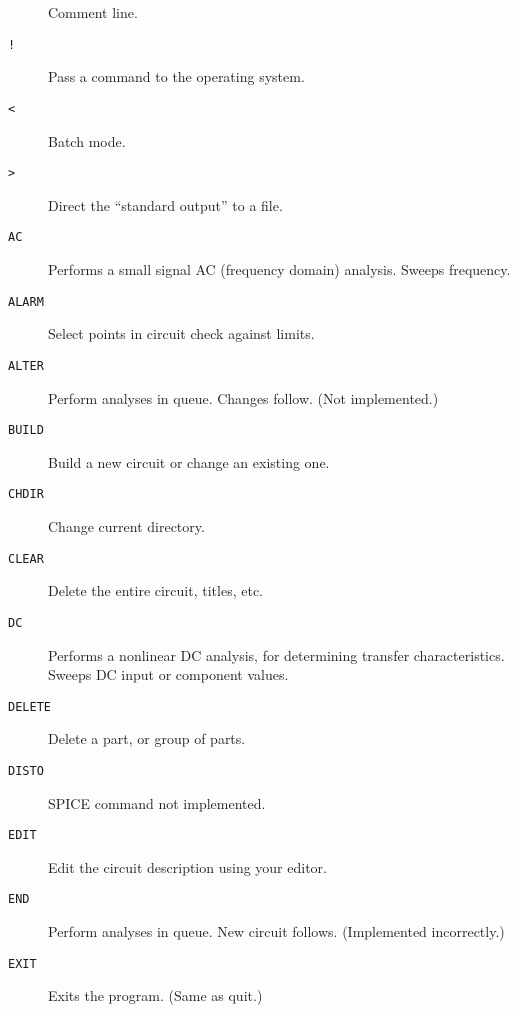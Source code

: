 \begin{description}

\item[{\tt *}] Comment line.

\item[{\tt !}] Pass a command to the operating system.

\item[{\tt <}] Batch mode.

\item[{\tt >}] Direct the ``standard output'' to a file.

\item[{\tt AC}] Performs a small signal AC (frequency domain) analysis.
Sweeps frequency.

\item[{\tt ALARM}] Select points in circuit check against limits.

\item[{\tt ALTER}] Perform analyses in queue.  Changes follow.  (Not
implemented.)

\item[{\tt BUILD}] Build a new circuit or change an existing one.

\item[{\tt CHDIR}] Change current directory.

\item[{\tt CLEAR}] Delete the entire circuit, titles, etc.

\item[{\tt DC}] Performs a nonlinear DC analysis, for determining transfer
characteristics.  Sweeps DC input or component values.

\item[{\tt DELETE}] Delete a part, or group of parts.

\item[{\tt DISTO}] SPICE command not implemented.

\item[{\tt EDIT}] Edit the circuit description using your editor.

\item[{\tt END}] Perform analyses in queue.  New circuit follows.
(Implemented incorrectly.)

\item[{\tt EXIT}] Exits the program.  (Same as quit.)



\end{description}

